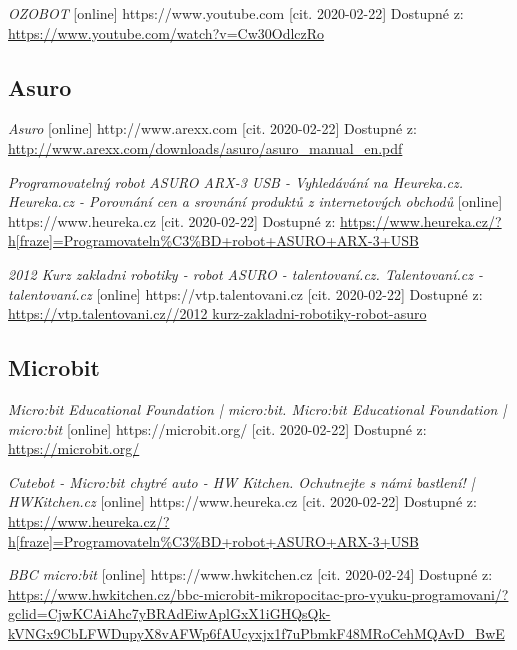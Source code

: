 \documentclass{template/socthesis}
\begin{document}
\begin{thebibliography}{1}
	\textit{OZOBOT} [online] https://www.youtube.com [cit. 2020-02-22] Dostupné z:
	\url{https://www.youtube.com/watch?v=Cw30OdlczRo}
	
	\subsection*{Asuro}
	
	\textit{Asuro} [online] http://www.arexx.com [cit. 2020-02-22] Dostupné z:
	\url{ http://www.arexx.com/downloads/asuro/asuro_manual_en.pdf}
	
	\textit{Programovatelný robot ASURO ARX-3 USB - Vyhledávání na Heureka.cz. Heureka.cz - Porovnání cen a srovnání produktů z internetových obchodů } [online] https://www.heureka.cz [cit. 2020-02-22] Dostupné z:
	\url{https://www.heureka.cz/?h[fraze]=Programovateln%C3%BD+robot+ASURO+ARX-3+USB}
		
	\textit{2012 Kurz zakladni robotiky - robot ASURO - talentovaní.cz. Talentovaní.cz - talentovaní.cz} [online] https://vtp.talentovani.cz [cit. 2020-02-22] Dostupné z:
	\url{https://vtp.talentovani.cz//2012 kurz-zakladni-robotiky-robot-asuro}
		
	\subsection*{Microbit}
		
	\textit{Micro:bit Educational Foundation | micro:bit. Micro:bit Educational Foundation | micro:bit} [online] https://microbit.org/ [cit. 2020-02-22] Dostupné z:
	\url{https://microbit.org/}
		
	\textit{Cutebot - Micro:bit chytré auto - HW Kitchen. Ochutnejte s námi bastlení! | HWKitchen.cz} [online] https://www.heureka.cz [cit. 2020-02-22] Dostupné z:
	\url{https://www.heureka.cz/?h[fraze]=Programovateln%C3%BD+robot+ASURO+ARX-3+USB}
	
	\textit{BBC micro:bit} [online] https://www.hwkitchen.cz [cit. 2020-02-24] Dostupné z:
	\url{https://www.hwkitchen.cz/bbc-microbit-mikropocitac-pro-vyuku-programovani/?gclid=CjwKCAiAhc7yBRAdEiwAplGxX1iGHQsQk-kVNGx9CbLFWDupyX8vAFWp6fAUcyxjx1f7uPbmkF48MRoCehMQAvD_BwE}
			
			

\end{thebibliography}
\end{document}
